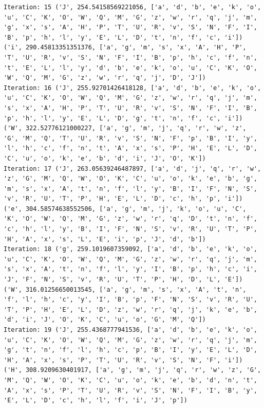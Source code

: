 \documentclass[11pt]{article}
\begin{document}
\begin{lstlisting}
Iteration: 15 ('J', 254.54158569221056, ['a', 'd', 'b', 'e', 'k', 'o', 'u', 'C', 'K', 'O', 'W', 'Q', 'M', 'G', 'z', 'w', 'r', 'q', 'j', 'm', 'g', 'x', 's', 'A', 'H', 'P', 'T', 'U', 'R', 'v', 'S', 'N', 'F', 'I', 'B', 'p', 'h', 'l', 'y', 'E', 'L', 'D', 't', 'n', 'f', 'c', 'i']) ('i', 290.45813351351376, ['a', 'g', 'm', 's', 'x', 'A', 'H', 'P', 'T', 'U', 'R', 'v', 'S', 'N', 'F', 'I', 'B', 'p', 'h', 'c', 'f', 'n', 't', 'E', 'L', 'l', 'y', 'd', 'b', 'e', 'k', 'o', 'u', 'C', 'K', 'O', 'W', 'Q', 'M', 'G', 'z', 'w', 'r', 'q', 'j', 'D', 'J'])
Iteration: 16 ('J', 255.92701426418128, ['a', 'd', 'b', 'e', 'k', 'o', 'u', 'C', 'K', 'O', 'W', 'Q', 'M', 'G', 'z', 'w', 'r', 'q', 'j', 'm', 's', 'x', 'A', 'H', 'P', 'T', 'U', 'R', 'v', 'S', 'N', 'F', 'I', 'B', 'p', 'h', 'l', 'y', 'E', 'L', 'D', 'g', 't', 'n', 'f', 'c', 'i']) ('W', 322.52776121000227, ['a', 'g', 'm', 'j', 'q', 'r', 'w', 'z', 'G', 'M', 'Q', 'T', 'U', 'R', 'v', 'S', 'N', 'F', 'p', 'B', 'I', 'y', 'l', 'h', 'c', 'f', 'n', 't', 'A', 'x', 's', 'P', 'H', 'E', 'L', 'D', 'C', 'u', 'o', 'k', 'e', 'b', 'd', 'i', 'J', 'O', 'K'])
Iteration: 17 ('J', 263.05639246487897, ['a', 'd', 'j', 'q', 'r', 'w', 'z', 'G', 'M', 'Q', 'W', 'O', 'K', 'C', 'u', 'o', 'k', 'e', 'b', 'g', 'm', 's', 'x', 'A', 't', 'n', 'f', 'l', 'y', 'B', 'I', 'F', 'N', 'S', 'v', 'R', 'U', 'T', 'P', 'H', 'E', 'L', 'D', 'c', 'h', 'p', 'i']) ('e', 304.58574638552506, ['a', 'g', 'm', 'j', 'k', 'o', 'u', 'C', 'K', 'O', 'W', 'Q', 'M', 'G', 'z', 'w', 'r', 'q', 'D', 't', 'n', 'f', 'c', 'h', 'l', 'y', 'B', 'I', 'F', 'N', 'S', 'v', 'R', 'U', 'T', 'P', 'H', 'A', 'x', 's', 'L', 'E', 'i', 'p', 'J', 'd', 'b'])
Iteration: 18 ('g', 259.1019607359092, ['a', 'd', 'b', 'e', 'k', 'o', 'u', 'C', 'K', 'O', 'W', 'Q', 'M', 'G', 'z', 'w', 'r', 'q', 'j', 'm', 's', 'x', 'A', 't', 'n', 'f', 'l', 'y', 'I', 'B', 'p', 'h', 'c', 'i', 'J', 'F', 'N', 'S', 'v', 'R', 'U', 'T', 'P', 'H', 'D', 'L', 'E']) ('W', 316.01256650013545, ['a', 'g', 'm', 's', 'x', 'A', 't', 'n', 'f', 'l', 'h', 'c', 'y', 'I', 'B', 'p', 'F', 'N', 'S', 'v', 'R', 'U', 'T', 'P', 'H', 'E', 'L', 'D', 'z', 'w', 'r', 'q', 'j', 'k', 'e', 'b', 'd', 'i', 'J', 'O', 'K', 'C', 'u', 'o', 'G', 'M', 'Q'])
Iteration: 19 ('J', 255.4368777941536, ['a', 'd', 'b', 'e', 'k', 'o', 'u', 'C', 'K', 'O', 'W', 'Q', 'M', 'G', 'z', 'w', 'r', 'q', 'j', 'm', 'g', 't', 'n', 'f', 'l', 'h', 'c', 'p', 'B', 'I', 'y', 'E', 'L', 'D', 'H', 'A', 'x', 's', 'P', 'T', 'U', 'R', 'v', 'S', 'N', 'F', 'i']) ('H', 308.9209630401917, ['a', 'g', 'm', 'j', 'q', 'r', 'w', 'z', 'G', 'M', 'Q', 'W', 'O', 'K', 'C', 'u', 'o', 'k', 'e', 'b', 'd', 'n', 't', 'A', 'x', 's', 'P', 'T', 'U', 'R', 'v', 'S', 'N', 'F', 'I', 'B', 'y', 'E', 'L', 'D', 'c', 'h', 'l', 'f', 'i', 'J', 'p'])

\end{lstlisting}
\end{document}
